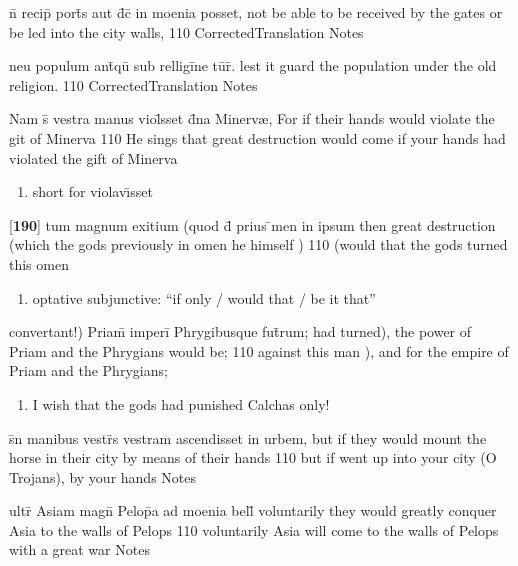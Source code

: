 \latline
  {n\={} recip\={\macron {\i}} port\={\macron {\i}}s aut d\={}c\={\macron {\i}} in moenia posset,}
  { not be able to be received by the gates or be led into the city walls, }
  {110}
  { CorrectedTranslation }
  { Notes }


\latline
  {neu populum ant\={\macron {\i}}qu\={} sub relligi\={}ne tu\={}r\={\macron {\i}}.}
  { lest it guard the population under the old religion. }
  {110}
  { CorrectedTranslation }
  { Notes }


\latline
  {Nam s\={\macron {\i}} vestra manus viol\={}sset d\={}na Minerv{\ae},}   
  { For if their hands would violate the git of Minerva }          
  {110}
  {He sings that great destruction would come if your hands had violated the gift of Minerva }
  { \begin{enumerate}
  	\item short for violav\={\i}sset
  \end{enumerate} }


\latline
  {[\textbf{190}] tum magnum exitium (quod d\={\macron {\i}} prius \={}men in ipsum}
  { then great destruction (which the gods previously in omen he himself ) }          
  {110}
  { (would that the gods turned this omen   }   
  { \begin{enumerate}
  	\item optative subjunctive:  ``if only / would that / be it that''
  \end{enumerate} }


\latline
  {convertant!) Priam\={\macron {\i}} imperi\={} Phrygibusque fut\={}rum;}
  { had turned), the power of Priam and the Phrygians would be; } 
  {110}
  { against this man ), and for the empire of Priam and the Phrygians; }
  { \begin{enumerate}
  	\item I wish that the gods had punished Calchas only!
  \end{enumerate} }


\latline
  {s\={\macron {\i}}n manibus vestr\={\macron {\i}}s vestram ascendisset in urbem,}      
  { but if they would mount the horse in their city by means of their hands }      
  {110}
  { but if went up into your city (O Trojans), by your hands }
  { Notes }


\latline
  {ultr\={} Asiam magn\={} Pelop\={}a ad moenia bell\={}}
	{ voluntarily they would greatly conquer Asia to the walls of Pelops   }
  {110}
  { voluntarily Asia will come to the walls of Pelops with a great war  }    
  { Notes }


